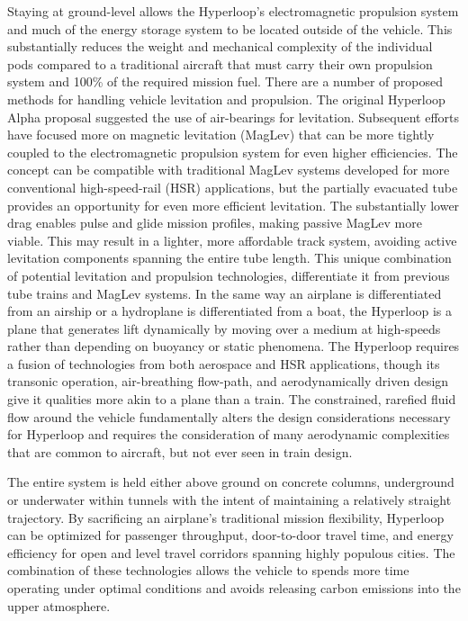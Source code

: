     Staying at ground-level allows the Hyperloop's electromagnetic propulsion
    system and much of the energy storage system to be located outside of the vehicle.
    This substantially reduces the weight and mechanical complexity of the
    individual pods compared to a traditional aircraft that must carry their
    own propulsion system and 100\% of the required mission fuel.
    There are a number of proposed methods for handling vehicle levitation and
    propulsion. The original Hyperloop Alpha proposal suggested the use of
    air-bearings for levitation.\cite{Musk}
    Subsequent efforts have focused more on magnetic levitation (MagLev) that
    can be more tightly coupled to the electromagnetic propulsion system for
    even higher efficiencies.
    The concept can be compatible with traditional MagLev systems developed for
    more conventional high-speed-rail (HSR) applications, but the partially
    evacuated tube provides an opportunity for even more efficient levitation.
    The substantially lower drag enables pulse and glide mission profiles,
    making passive MagLev more viable. This may result in a lighter, more affordable track
    system, avoiding active levitation components spanning the entire tube length.
    This unique combination of potential levitation and propulsion technologies,
    differentiate it from previous tube trains and MagLev systems.
    In the same way an airplane is differentiated from an airship or a hydroplane
    is differentiated from a boat, the Hyperloop is a plane that generates lift
    dynamically by moving over a medium at high-speeds
    rather than depending on buoyancy or static phenomena.
    The Hyperloop requires a fusion of technologies from both aerospace and HSR
    applications, though its transonic operation, air-breathing flow-path, and
    aerodynamically driven design give it qualities more akin to a plane than a train.
    The constrained, rarefied fluid flow around the vehicle
    fundamentally alters the design considerations necessary for Hyperloop and
    requires the consideration of many aerodynamic complexities that
    are common to aircraft, but not ever seen in train design.

    The entire system is held either above ground on concrete
    columns, underground or underwater within tunnels with the intent of
    maintaining a relatively straight trajectory.
    By sacrificing an airplane's traditional mission flexibility,
    Hyperloop can be optimized for passenger throughput, door-to-door travel time,
    and energy efficiency for open and level travel corridors spanning highly
    populous cities. The combination of these technologies allows the
    vehicle to spends more time operating under optimal conditions and avoids
    releasing carbon emissions into the upper atmosphere.

